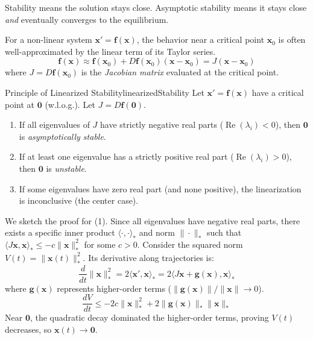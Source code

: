 \documentclass{book}
\newenvironment{Proof}[1][]
  {\begin{ProofTcb}[#1]}
  {\end{ProofTcb}}
\renewcommand{\Re}{{\operatorname{Re}}}
\begin{document}
Stability means the solution stays close. Asymptotic stability means it stays close \emph{and} eventually converges to the equilibrium.


For a non-linear system $\mathbf{x}' = \mathbf{f}(\mathbf{x})$, the behavior near a critical point $\mathbf{x}_0$ is often well-approximated by the linear term of its Taylor series.
\[
    \mathbf{f}(\mathbf{x}) \approx \mathbf{f}(\mathbf{x}_0) + D\mathbf{f}(\mathbf{x}_0)(\mathbf{x} - \mathbf{x}_0) = J(\mathbf{x} - \mathbf{x}_0)
\]
where $J = D\mathbf{f}(\mathbf{x}_0)$ is the \emph{Jacobian matrix} evaluated at the critical point.

\begin{thm}{Principle of Linearized Stability}{linearizedStability}
    Let $\mathbf{x}' = \mathbf{f}(\mathbf{x})$ have a critical point at $\mathbf{0}$ (w.l.o.g.). Let $J = D\mathbf{f}(\mathbf{0})$.
    \begin{enumerate}
        \item If all eigenvalues of $J$ have strictly negative real parts ($\Re(\lambda_i) < 0$), then $\mathbf{0}$ is \emph{asymptotically stable}.
        \item If at least one eigenvalue has a strictly positive real part ($\Re(\lambda_i) > 0$), then $\mathbf{0}$ is \emph{unstable}.
        \item If some eigenvalues have zero real part (and none positive), the linearization is inconclusive (the center case).
    \end{enumerate}
\end{thm}

\begin{Proof}
    We sketch the proof for (1). Since all eigenvalues have negative real parts, there exists a specific inner product $\langle \cdot, \cdot \rangle_*$ and norm $\|\cdot\|_*$ such that $\langle J\mathbf{x}, \mathbf{x} \rangle_* \le -c \|\mathbf{x}\|_*^2$ for some $c > 0$.
    Consider the squared norm $V(t) = \|\mathbf{x}(t)\|_*^2$. Its derivative along trajectories is:
    \[
        \frac{d}{dt} \|\mathbf{x}\|_*^2 = 2\langle \mathbf{x}', \mathbf{x} \rangle_* = 2\langle J\mathbf{x} + \mathbf{g}(\mathbf{x}), \mathbf{x} \rangle_*
    \]
    where $\mathbf{g}(\mathbf{x})$ represents higher-order terms ($\|\mathbf{g}(\mathbf{x})\|/\|\mathbf{x}\| \to 0$).
    \[
        \frac{dV}{dt} \le -2c \|\mathbf{x}\|_*^2 + 2\|\mathbf{g}(\mathbf{x})\|_* \|\mathbf{x}\|_*
    \]
    Near $\mathbf{0}$, the quadratic decay dominated the higher-order terms, proving $V(t)$ decreases, so $\mathbf{x}(t) \to \mathbf{0}$.
\end{Proof}
\end{document}
